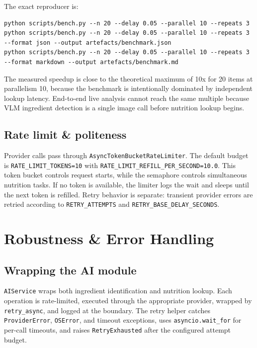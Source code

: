 \documentclass[11pt,a4paper]{article}
\begin{document}
The exact reproducer is:
\begin{lstlisting}[style=bash]
python scripts/bench.py --n 20 --delay 0.05 --parallel 10 --repeats 3
python scripts/bench.py --n 20 --delay 0.05 --parallel 10 --repeats 3 --format json --output artefacts/benchmark.json
python scripts/bench.py --n 20 --delay 0.05 --parallel 10 --repeats 3 --format markdown --output artefacts/benchmark.md
\end{lstlisting}

The measured speedup is close to the theoretical maximum of 10x for 20 items at parallelism 10, because the benchmark is intentionally dominated by independent lookup latency. End-to-end live analysis cannot reach the same multiple because VLM ingredient detection is a single image call before nutrition lookup begins.

\subsection{Rate limit \& politeness}
Provider calls pass through \texttt{AsyncTokenBucketRateLimiter}. The default budget is \texttt{RATE\_LIMIT\_TOKENS=10} with \texttt{RATE\_LIMIT\_REFILL\_PER\_SECOND=10.0}. This token bucket controls request starts, while the semaphore controls simultaneous nutrition tasks. If no token is available, the limiter logs the wait and sleeps until the next token is refilled. Retry behavior is separate: transient provider errors are retried according to \texttt{RETRY\_ATTEMPTS} and \texttt{RETRY\_BASE\_DELAY\_SECONDS}.

\section{Robustness \& Error Handling}\label{sec:robustness}

\subsection{Wrapping the AI module}
\texttt{AIService} wraps both ingredient identification and nutrition lookup. Each operation is rate-limited, executed through the appropriate provider, wrapped by \texttt{retry\_async}, and logged at the boundary. The retry helper catches \texttt{ProviderError}, \texttt{OSError}, and timeout exceptions, uses \texttt{asyncio.wait\_for} for per-call timeouts, and raises \texttt{RetryExhausted} after the configured attempt budget.
\end{document}

